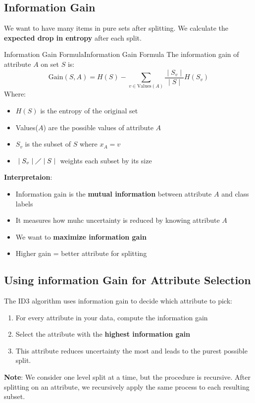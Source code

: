 \documentclass[a4paper]{article}
\theoremstyle{definition}
\begin{document}
\subsection{Information Gain}
We want to have many items in pure sets after splitting. We calculate the \textbf{expected drop in entropy} after each 
split.
\begin{definition}{Information Gain Formula}{Information Gain Formula}
The information gain of attribute \( A \) on set \( S \) is:
\[
  \text{Gain}(S,A) = H(S) - \sum_{v\in \text{Values}(A)} \frac{\;|\;S_v\;|\;}{\;|\;S\;|\;} H(S_v)
\]
Where:
\begin{itemize}
    \item \( H(S) \) is the entropy of the original set 
    \item Values(\( A \)) are the possible values of attribute \( A \)    
    \item \( S_v \) is the subset of \( S \) where \( x_A = v \)    
    \item \( \;|\;S_v\;|\;\diagup \;|\;S\;|\; \) weights each subset by its size
\end{itemize}
\end{definition}
\textbf{Interpretaion}:
\begin{itemize}
    \item Information gain is the \textbf{mutual information} between attribute \( A \) and class labels 
    \item It measures how muhc uncertainty is reduced by knowing attribute \( A \)   
    \item We want to \textbf{maximize information gain}
    \item Higher gain = better attribute for splitting
\end{itemize}
\subsection{Using information Gain for Attribute Selection}
The ID3 algorithm uses information gain to decide which attribute to pick:
\begin{enumerate}
    \item For every attribute in your data, compute the information gain 
    \item Select the attribute with the \textbf{highest information gain}
    \item This attribute reduces uncertainty the most and leads to the purest possible split.
\end{enumerate}
\textbf{Note}: We consider one level split at a time, but the procedure is recursive. After splitting on an attribute,
we recursively apply the same process to each resulting subset.
\end{document}
